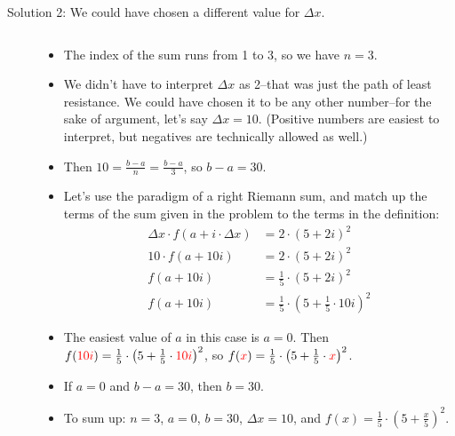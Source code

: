 \begin{solution}
\begin{description}
\item[Solution 2: We could have chosen a different value for $\Delta x$.]
$ $
\begin{itemize}
\item The index of the sum runs from 1 to 3, so we have $n=3$.
\item We didn't have to interpret $\Delta x$ as 2--that was just the path of least resistance. We could have chosen it to be any other number--for the sake of argument, let's say $\Delta x=10$. (Positive numbers are easiest to interpret, but negatives are technically allowed as well.)

\item Then $10=\frac{b-a}{n}=\frac{b-a}{3}$, so $b-a=30$.
\item Let's use the paradigm of a right Riemann sum, and match up the terms of the sum given in the problem to the terms in the definition:
\begin{align*}
\Delta x \cdot f\left(a+i\cdot \Delta x\right)&= 2\cdot\left(5+2i\right)^2\\
10 \cdot f(a+10i)&= 2\cdot\left(5+2i\right)^2\\
f(a+10i)&=\frac{1}{5}\cdot\left(5+2i\right)^2\\
f(a+10i)&=\frac{1}{5}\cdot\left(5+\frac{1}{5}\cdot 10i\right)^2
\end{align*}
\item The easiest value of $a$ in this case is  $a=0$. Then $f(\textcolor{red}{10i}) = \frac{1}{5}\cdot\left(5+\frac{1}{5}\cdot \textcolor{red}{10i}\right)^2$, so $f(\textcolor{red}{x})= \frac{1}{5}\cdot\left(5+\frac{1}{5}\cdot \textcolor{red}{x}\right)^2$.
\item If $a=0$ and $b-a=30$, then $b=30$.
\item To sum up: $n=3$, $a=0$, $b=30$, $\Delta x = 10$, and $f(x)= \frac{1}{5}\cdot\left(5+\frac{x}{5} \right)^2$.


\end{itemize}
\end{description}
\end{solution}
